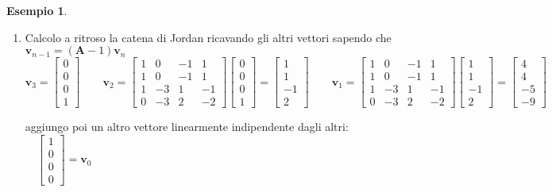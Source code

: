 \documentclass[a4paper]{article}
\renewcommand{\vec}{\bm}
\theoremstyle{definition}
\newtheorem{exmp}{Esempio}[section]
\begin{document}
\begin{exmp}
\begin{enumerate}
					\item Calcolo a ritroso la catena di Jordan ricavando gli altri vettori sapendo che $ \vec{v}_{n-1} = (\vec{A} - 1 )\vec{v}_n $
					\[
						\vec{v}_3 =
						\begin{bmatrix}
							0 \\ 0 \\ 0 \\ 1
						\end{bmatrix}
						\qquad
						\vec{v}_2 =
						\begin{bmatrix}
							1 & 0 & -1 & 1 \\
							1 & 0 & -1 & 1 \\
							1 & -3 & 1 & -1 \\
							0 & -3 & 2 & -2
						\end{bmatrix}
						\begin{bmatrix}
							0 \\ 0 \\ 0 \\ 1
						\end{bmatrix}
						=
						\begin{bmatrix}
							1 \\ 1 \\ -1 \\ 2
						\end{bmatrix}
						\qquad
						\vec{v}_1 =
						\begin{bmatrix}
						1 & 0 & -1 & 1 \\
						1 & 0 & -1 & 1 \\
						1 & -3 & 1 & -1 \\
						0 & -3 & 2 & -2
						\end{bmatrix}
						\begin{bmatrix}
							1 \\ 1 \\ -1 \\ 2
						\end{bmatrix}
						=
						\begin{bmatrix}
							4 \\ 4 \\ -5 \\ -9
						\end{bmatrix}
					\]
					
					aggiungo poi un altro vettore linearmente indipendente dagli altri:$\quad \begin{bmatrix}
					1 \\ 0 \\ 0 \\ 0
					\end{bmatrix}  = \vec{v}_0$
					

\end{enumerate}
\end{exmp}
\end{document}

